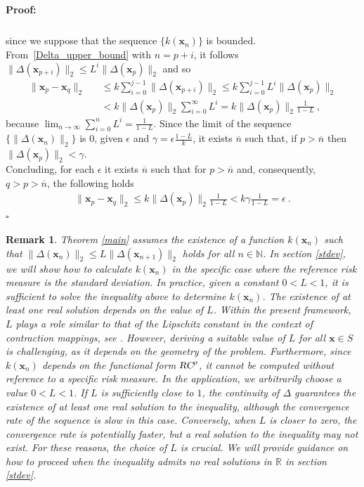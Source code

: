 \documentclass[preprint,11pt,authoryear]{elsarticle}
\newtheorem{remark}{Remark}%
\newenvironment{proof}{\paragraph{Proof:}}{\hfill$\square$}
\begin{document}
\begin{proof}
{\begin{eqnarray*}
\end{eqnarray*}
since we suppose that the sequence $ \{k(\mathbf{x}_n)\}$ is bounded.
From~\eqref{Delta_upper_bound} with $n=p+i$, it follows $\|\Delta (\mathbf x_{p+i})\|_2 \le L^i \|\Delta (\mathbf x_{p})\|_2$ and so
\begin{eqnarray*}
\|  \mathbf{x}_p -   \mathbf{x}_q\|_2 && \le k \sum_{i = 0}^{j-1} \|\Delta(\mathbf x_{p+i})\|_2 \le k \sum_{i = 0}^{j-1} L^i \|\Delta (  \mathbf{x}_p)\|_2 \\
&&< k\|\Delta (  \mathbf{x}_p)\|_2 \sum_{i = 0}^{\infty }  L^i= k\|\Delta(  \mathbf{x}_p)\|_2 \frac 1 {1-L} \ ,
\end{eqnarray*}
because $\lim_{n \rightarrow \infty}\sum_{i = 0}^n L^i = \frac{1}{1-L}$.
Since the limit of the sequence $\{\|\Delta( \mathbf x_n)\|_2\}$ is $0$, given $\epsilon$ and $\gamma=\epsilon\frac{1-L}k$, it exists $\overline n$ such that, if $p> \overline n$ then $\|\Delta  ( \mathbf{x}_p)\|_2< \gamma$. \\
Concluding, for each $\epsilon$ it exists $\overline n$ such that for $p> \overline n$ and, consequently, $q>p>\overline n$, the following holds 
\begin{eqnarray*}
\|   \mathbf{x}_p -   \mathbf{x}_q\|_2 \le k\|\Delta   (\mathbf{x}_p)\|_2 \frac 1 {1-L} < k \gamma  \frac 1 {1-L} =\epsilon \ .
\end{eqnarray*}}
\end{proof}

\begin{remark}
Theorem \ref{main} assumes the existence of a function $k(\mathbf x_n)$ such that $\|\Delta (\mathbf{x}_n) \|_2 \leq L \|\Delta (\mathbf{x}_{n+1}) \|_2$ holds for all $n \in \mathbb N$. In section \ref{stdev}, we will show how to calculate $k(\mathbf x_n)$ in the specific case where the reference risk measure is the standard deviation. In practice, given a constant $0<L<1$, it is sufficient to solve the inequality above to determine $k(\mathbf x_n)$. The existence of at least one real solution depends on the value of $L$. Within the present framework, $L$ plays a role similar to that of the Lipschitz constant in the context of contraction mappings, see \cite{banach1922operations}. However, deriving a suitable value of $L$ for all $\mathbf{x} \in S$ is challenging, as it depends on the geometry of the problem. Furthermore, since $k(\mathbf x_n)$ depends on the functional form $\textsl{RC}^{\rho}$, it cannot be computed without reference to a specific risk measure. In the application, we arbitrarily choose a value $0<L<1$. If $L$ is sufficiently close to $1$, the continuity of $\Delta$ guarantees the existence of at least one real solution to the inequality, although the convergence rate of the sequence is slow in this case. Conversely, when $L$ is closer to zero, the convergence rate is potentially faster, but a real solution to the inequality may not exist. For these reasons, the choice of $L$ is crucial. We will provide guidance on how to proceed when the inequality admits no real solutions in $\mathbb R$ in section \ref{stdev}.
\end{remark}
\end{document}
